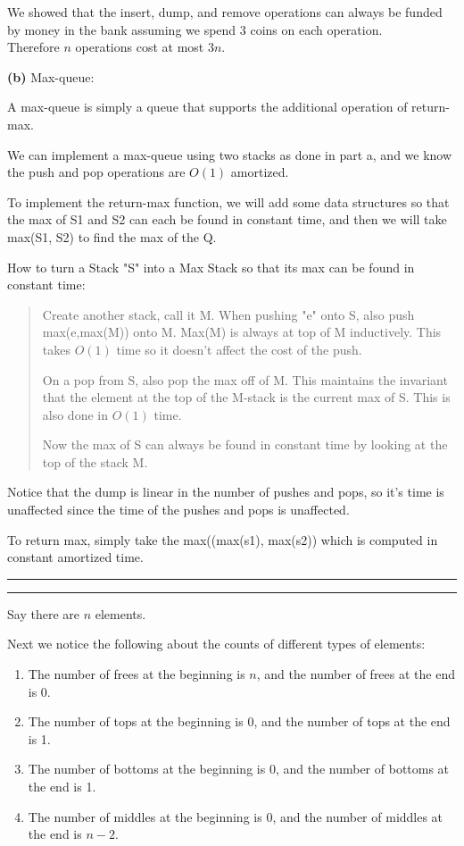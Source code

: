 \documentclass[11pt]{article}
\newcommand{\question}[2] {\vspace{.25in} \hrule\vspace{0.5em}
\noindent{\bf #1: #2} \vspace{0.5em}
\hrule \vspace{.10in}}
\renewcommand{\part}[1] {\vspace{.10in} {\bf (#1)}}
\begin{document}
We showed that the insert, dump, and remove operations can always be funded by money in the bank assuming we spend 3 coins on each operation.\\
Therefore $n$ operations cost at most $3n$.

\part{b} Max-queue:

A max-queue is simply a queue that supports the additional operation of return-max.

We can implement a max-queue using two stacks as done in part a, and we know the push and pop operations are $O(1)$ amortized.

To implement the return-max function, we will add some data structures so that the max of S1 and S2 can each be found in constant time, and then we will take max(S1, S2) to find the max of the Q.

How to turn a Stack "S" into a Max Stack so that its max can be found in constant time:

\begin{quote}
Create another stack, call it M.
When pushing "e" onto S, also push max(e,max(M)) onto M. Max(M) is always at top of M inductively.
This takes $O(1)$ time so it doesn't affect the cost of the push.

On a pop from S, also pop the max off of M.
This maintains the invariant that the element at the top of the M-stack is the current max of S.
This is also done in $O(1)$ time.

Now the max of S can always be found in constant time by looking at the top of the stack M.
\end{quote}

Notice that the dump is linear in the number of pushes and pops, so it's time is unaffected since the time of the pushes and pops is unaffected.

To return max, simply take the max((max(s1), max(s2)) which is computed in constant amortized time.


\question{2}{You Be the Adversary}

Say there are $n$ elements.

Next we notice the following about the counts of different types of elements:

\begin{enumerate}
\item The number of frees at the beginning is $n$, and the number of frees at the end is 0.
\item The number of tops at the beginning is $0$, and the number of tops at the end is 1.
\item The number of bottoms at the beginning is $0$, and the number of bottoms at the end is 1.
\item The number of middles at the beginning is $0$, and the number of middles at the end is $n-2$.
\end{enumerate}
\end{document}
